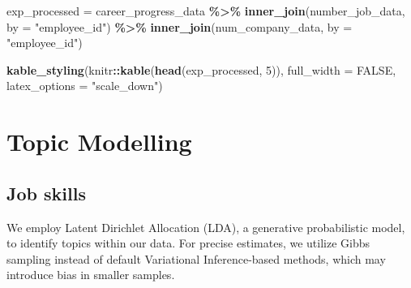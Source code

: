 \documentclass[11pt,]{article}
\newenvironment{Shaded}{\begin{snugshade}}{\end{snugshade}}
\newcommand{\AttributeTok}[1]{\textcolor[rgb]{0.13,0.29,0.53}{#1}}
\newcommand{\ConstantTok}[1]{\textcolor[rgb]{0.56,0.35,0.01}{#1}}
\newcommand{\DecValTok}[1]{\textcolor[rgb]{0.00,0.00,0.81}{#1}}
\newcommand{\FunctionTok}[1]{\textcolor[rgb]{0.13,0.29,0.53}{\textbf{#1}}}
\newcommand{\NormalTok}[1]{#1}
\newcommand{\OtherTok}[1]{\textcolor[rgb]{0.56,0.35,0.01}{#1}}
\newcommand{\SpecialCharTok}[1]{\textcolor[rgb]{0.81,0.36,0.00}{\textbf{#1}}}
\newcommand{\StringTok}[1]{\textcolor[rgb]{0.31,0.60,0.02}{#1}}
\begin{document}
\begin{Shaded}
\begin{Highlighting}[]
\NormalTok{exp\_processed }\OtherTok{=}\NormalTok{ career\_progress\_data }\SpecialCharTok{\%\textgreater{}\%} 
  \FunctionTok{inner\_join}\NormalTok{(number\_job\_data, }\AttributeTok{by =} \StringTok{"employee\_id"}\NormalTok{) }\SpecialCharTok{\%\textgreater{}\%} 
  \FunctionTok{inner\_join}\NormalTok{(num\_company\_data, }\AttributeTok{by =} \StringTok{"employee\_id"}\NormalTok{)}

\FunctionTok{kable\_styling}\NormalTok{(knitr}\SpecialCharTok{::}\FunctionTok{kable}\NormalTok{(}\FunctionTok{head}\NormalTok{(exp\_processed, }\DecValTok{5}\NormalTok{)), }
              \AttributeTok{full\_width =} \ConstantTok{FALSE}\NormalTok{, }\AttributeTok{latex\_options =} \StringTok{"scale\_down"}\NormalTok{)}
\end{Highlighting}
\end{Shaded}

\begin{table}
\centering
{}
\end{table}

\hypertarget{topic-modelling}{%
\section{Topic Modelling}\label{topic-modelling}}

\hypertarget{job-skills}{%
\subsection{Job skills}\label{job-skills}}

We employ Latent Dirichlet Allocation (LDA), a generative probabilistic
model, to identify topics within our data. For precise estimates, we
utilize Gibbs sampling instead of default Variational Inference-based
methods, which may introduce bias in smaller samples.
\end{document}
